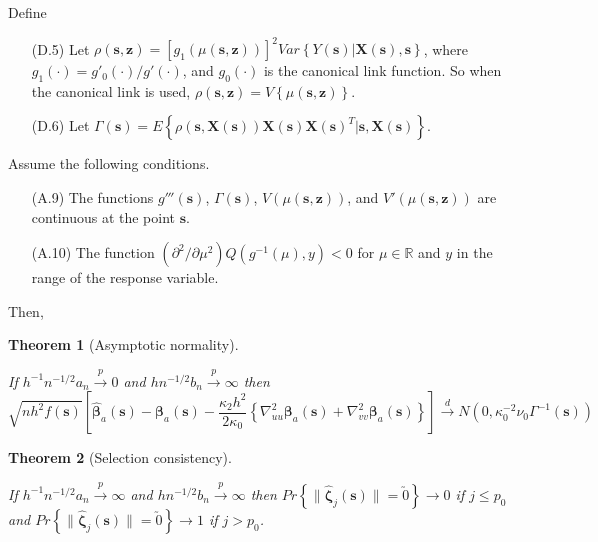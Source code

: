 \documentclass[authoryear,review, 12pt]{elsarticle}
\newtheorem{thm}{Theorem}
\begin{document}
Define
\begin{itemize}
\item[(D.5)] Let $\rho\left(\bm{s},\bm{z}\right)=\left[g_{1}\left(\mu\left(\bm{s},\bm{z}\right)\right)\right]^{2}Var\left\{ Y\left(\bm{s}\right)|\bm{X}\left(\bm{s}\right),\bm{s}\right\} $,
where $g_{1}\left(\cdot\right)=g'_{0}\left(\cdot\right)/g'\left(\cdot\right)$,
and $g_{0}\left(\cdot\right)$ is the canonical link function. So
when the canonical link is used, $\rho\left(\bm{s},\bm{z}\right)=V\left\{ \mu\left(\bm{s},\bm{z}\right)\right\} $.
\item[(D.6)] Let $\Gamma\left(\bm{s}\right)=E\left\{ \rho\left(\bm{s},\bm{X}\left(\bm{s}\right)\right)\bm{X}\left(\bm{s}\right)\bm{X}\left(\bm{s}\right)^{T}|\bm{s},\bm{X}\left(\bm{s}\right)\right\} $.
\end{itemize}
Assume the following conditions.
\begin{itemize}
\item[(A.9)] The functions $g'''\left(\bm{s}\right)$, $\Gamma\left(\bm{s}\right)$,
$V\left(\mu\left(\bm{s},\bm{z}\right)\right)$, and $V'\left(\mu\left(\bm{s},\bm{z}\right)\right)$
are continuous at the point $\bm{s}$.
\item[(A.10)] The function $\left(\partial^{2}/\partial\mu^{2}\right)Q\left(g^{-1}\left(\mu\right),y\right)<0$
for $\mu\in\mathbb{R}$ and $y$ in the range of the response variable.
\end{itemize}
Then,
\begin{thm}[Asymptotic normality]
\label{theorem:normality-glm} 



If $h^{-1}n^{-1/2}a_{n}\xrightarrow{p}0$ and $hn^{-1/2}b_{n}\xrightarrow{p}\infty$
then 
\[
\sqrt{nh^{2}f\left(\bm{s}\right)}\left[\hat{\bm{\beta}}_{a}(\bm{s})-\bm{\beta}_{a}(\bm{s})-\frac{\kappa_{2}h^{2}}{2\kappa_{0}}\left\{ \nabla_{uu}^{2}\bm{\beta}_{a}(\bm{s})+\nabla_{vv}^{2}\bm{\beta}_{a}(\bm{s})\right\} \right]\xrightarrow{d}N\left(0,\kappa_{0}^{-2}\nu_{0}\Gamma^{-1}(\bm{s})\right)
\]

\end{thm}

\begin{thm}[Selection consistency]
\label{theorem:selection-glm}



If $h^{-1}n^{-1/2}a_{n}\xrightarrow{p}\infty$ and $hn^{-1/2}b_{n}\xrightarrow{p}\infty$
then $Pr\left\{ \|\hat{\bm{\zeta}}_{j}(\bm{s})\|=\utilde{0}\right\} \to0$
if $j\le p_{0}$ and $Pr\left\{ \|\hat{\bm{\zeta}}_{j}(\bm{s})\|=\utilde{0}\right\} \to1$
if $j>p_{0}$. 
\end{thm}
\appendix
\end{document}
